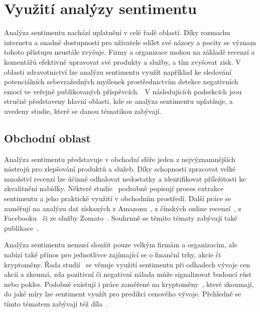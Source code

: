 \section{Využití analýzy sentimentu}
Analýza sentimentu nachází uplatnění v celé řadě oblastí. Díky rozmachu internetu a snadné dostupnosti pro uživatele sdílet své názory a pocity se význam tohoto přístupu neustále zvyšuje. Firmy a organizace mohou na základě recenzí a komentářů efektivně upravovat své produkty a služby, a tím zvyšovat zisk. V oblasti zdravotnictví lze analýzu sentimentu využít například ke sledování potenciálních sebevražedných myšlenek prostřednictvím detekce negativních emocí ve veřejně publikovaných příspěvcích.~\cite{kumar2023comprehensivereviewsentimentanalysis} V následujících podsekcích jsou stručně představeny hlavní oblasti, kde se analýza sentimentu uplatňuje, a uvedeny studie, které se danou tématikou zabývají.

\subsection{Obchodní oblast}
Analýza sentimentu představuje v obchodní sféře jeden z nejvýznamnějších nástrojů pro zlepšování produktů a služeb. Díky schopnosti zpracovat velké množství recenzí lze účinně odhalovat nedostatky a identifikovat příležitosti ke zkvalitnění nabídky. Některé studie~\cite{Sreesurya2020, KUMAR201941} podrobně popisují proces extrakce sentimentu a jeho praktické využití v obchodním prostředí. Další práce se zaměřují na analýzu dat získaných z Amazonu~\cite{BoseSentiment}, z čínských online recenzí~\cite{Wang12022016}, z Facebooku~\cite{Baj-Rogowska} či ze služby Zomato~\cite{9574641}. Souhrnně se těmito tématy zabývají také publikace~\cite{kumar2023comprehensivereviewsentimentanalysis, MAO2024102048, BIRJALI2021107134}.

Analýza sentimentu nemusí sloužit pouze velkým firmám a organizacím, ale nabízí také přínos pro jednotlivce zajímající se o finanční trhy, akcie či kryptoměny. Řada studií~\cite{TadleFOMC, DohHowtoSay, Xing2018} se věnuje využití sentimentu při odhadech vývoje cen akcií a zkoumá, zda pozitivní či negativní nálada může signalizovat budoucí růst nebo pokles. Podobně existují i práce zaměřené na kryptoměny~\cite{ROGNONE2020101462, KRAAIJEVELD2020101188}, které zkoumají, do jaké míry lze sentiment využít pro predikci cenového vývoje. Přehledně se tímto tématem zabývají též díla~\cite{kumar2023comprehensivereviewsentimentanalysis, MAO2024102048, BIRJALI2021107134}.

